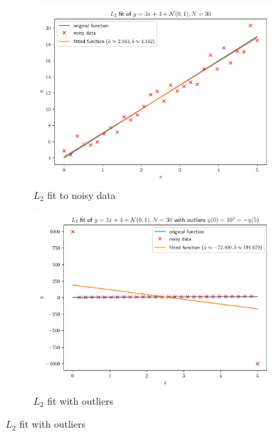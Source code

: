\documentclass[oneside, a4paper]{book}
\begin{document}
\begin{figure}[H]
  \begin{subfigure}{0.5\textwidth}
    \centering
    \includegraphics[width=\linewidth]{linreg.pdf}
    \caption{$L_2$ fit to noisy data}
    \label{fig:linreg}
  \end{subfigure}%
  \begin{subfigure}{0.5\textwidth}
    \centering
    \includegraphics[width=\linewidth]{linregout.pdf}
    \caption{$L_2$ fit with outliers}
    \label{fig:linregout}
  \end{subfigure}


\end{figure}
\end{document}
